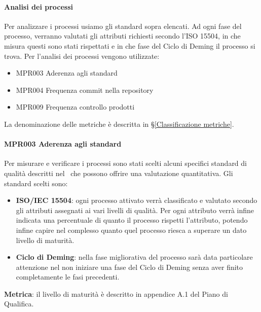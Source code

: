 			\paragraph{Analisi dei processi}
			Per analizzare i processi usiamo gli standard sopra elencati. Ad ogni fase del processo, verranno valutati gli attributi richiesti secondo
			l'ISO 15504, in che misura questi sono stati rispettati e in che fase del Ciclo di Deming il processo si trova.
			Per l'analisi dei processi vengono utilizzate:

			\begin{itemize}
                \item MPR003 Aderenza agli standard
				\item MPR004 Frequenza commit nella repository
				\item MPR009 Frequenza controllo prodotti
			\end{itemize}

			La denominazione delle metriche è descritta in \S\ref{Classificazione metriche}.
            
            \paragraph{MPR003 Aderenza agli standard}
            Per misurare e verificare i processi sono stati scelti alcuni specifici standard di qualità descritti nel \PdQ\ che possono offrire una valutazione quantitativa.
            Gli standard scelti sono:
            
            \begin{itemize}
                \item \textbf{ISO/IEC 15504}: ogni processo attivato verrà classificato e valutato secondo gli attributi assegnati ai vari livelli di qualità. Per ogni attributo verrà infine indicata una percentuale di quanto il processo rispetti l'attributo, potendo infine capire nel complesso quanto quel processo riesca a superare un dato livello di maturità.
                \item \textbf{Ciclo di Deming}: nella fase migliorativa del processo sarà data particolare attenzione nel non iniziare una fase del Ciclo di Deming senza aver finito completamente le fasi precedenti.
            \end{itemize}
            
	        \textbf{Metrica}: il livello di maturità è descritto in appendice A.1 del Piano di Qualifica.
		
